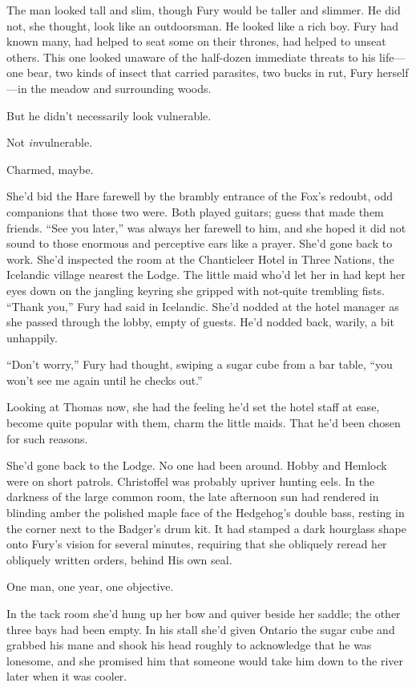 \documentclass[11pt,a5paper]{article}
\begin{document}
The man looked tall and slim, though Fury would be taller and slimmer. He did not, she thought, look like an outdoorsman. He looked like a rich boy. Fury had known many, had helped to seat some on their thrones, had helped to unseat others. This one looked unaware of the half-dozen immediate threats to his life---one bear, two kinds of insect that carried parasites, two bucks in rut, Fury herself---in the meadow and surrounding woods.

But he didn't necessarily look vulnerable.

Not \emph{in}vulnerable.

Charmed, maybe.

She'd bid the Hare farewell by the brambly entrance of the Fox's redoubt, odd companions that those two were. Both played guitars; guess that made them friends. ``See you later,'' was always her farewell to him, and she hoped it did not sound to those enormous and perceptive ears like a prayer. She'd gone back to work. She'd inspected the room at the Chanticleer Hotel in Three Nations, the Icelandic village nearest the Lodge. The little maid who'd let her in had kept her eyes down on the jangling keyring she gripped with not-quite trembling fists. ``Thank you,'' Fury had said in Icelandic. She'd nodded at the hotel manager as she passed through the lobby, empty of guests. He'd nodded back, warily, a bit unhappily.

``Don't worry,'' Fury had thought, swiping a sugar cube from a bar table, ``you won't see me again until he checks out.''

Looking at Thomas now, she had the feeling he'd set the hotel staff at ease, become quite popular with them, charm the little maids. That he'd been chosen for such reasons.

She'd gone back to the Lodge. No one had been around. Hobby and Hemlock were on short patrols. Christoffel was probably upriver hunting eels. In the darkness of the large common room, the late afternoon sun had rendered in blinding amber the polished maple face of the Hedgehog's double bass, resting in the corner next to the Badger's drum kit. It had stamped a dark hourglass shape onto Fury's vision for several minutes, requiring that she obliquely reread her obliquely written orders, behind His own seal.

One man, one year, one objective.

In the tack room she'd hung up her bow and quiver beside her saddle; the other three bays had been empty. In his stall she'd given Ontario the sugar cube and grabbed his mane and shook his head roughly to acknowledge that he was lonesome, and she promised him that someone would take him down to the river  later when it was cooler.
\end{document}
